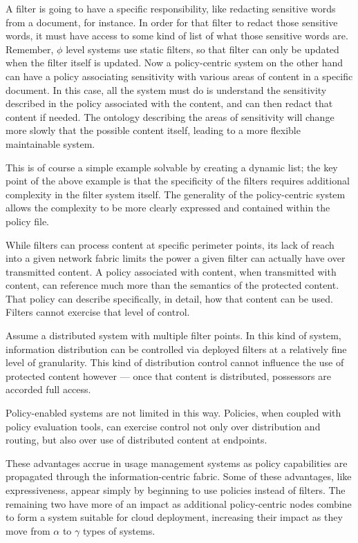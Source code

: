 A filter is going to have a specific responsibility, like redacting sensitive words from a document, for instance.  In order for that filter to redact those sensitive words, it must have access to some kind of list of what those sensitive words are.  Remember, $\phi$ level systems use static filters, so that filter can only be updated when the filter itself is updated.  Now a policy-centric system on the other hand can have a policy associating sensitivity with various areas of content in a specific document.  In this case, all the system must do is understand the sensitivity described in the policy associated with the content, and can then redact that content if needed.  The ontology describing the areas of sensitivity will change more slowly that the possible content itself, leading to a more flexible maintainable system.

This is of course a simple example solvable by creating a dynamic list; the key point of the above example is that the specificity of the filters requires additional complexity in the filter system itself.  The generality of the policy-centric system allows the complexity to be more clearly expressed and contained within the policy file.

While filters can process content at specific perimeter points, its lack of reach into a given network fabric limits the power a given filter can actually have over transmitted content.  A policy associated with content, when transmitted with content, can reference much more than the semantics of the protected content.  That policy can describe specifically, in detail, how that content can be used.  Filters cannot exercise that level of control.

Assume a distributed system with multiple filter points.  In this kind of system, information distribution can be controlled via deployed filters at a relatively fine level of granularity.  This kind of distribution control cannot influence the use of protected content however --- once that content is distributed, possessors are accorded full access.

Policy-enabled systems are not limited in this way.  Policies, when coupled with policy evaluation tools, can exercise control not only over distribution and routing, but also over use of distributed content at endpoints.

These advantages accrue in usage management systems as policy capabilities are propagated through the information-centric fabric.  Some of these advantages, like expressiveness, appear simply by beginning to use policies instead of filters.  The remaining two have more of an impact as additional policy-centric nodes combine to form a system suitable for cloud deployment, increasing their impact as they move from $\alpha$ to $\gamma$ types of systems.

